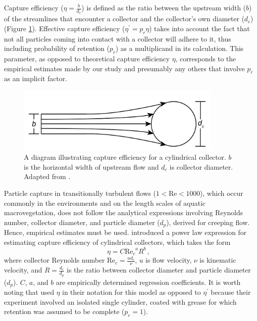 \documentclass{scrreprt}
\newcommand\Rey{\mathrm{Re}}
\begin{document}
Capture efficiency ($\eta=\frac{b}{d_c}$) is defined as the ratio between the upstream width ($b$) of the streamlines that encounter a collector and the collector's own diameter ($d_c$) (Figure \ref{fig:capeff}). Effective capture efficiency ($\eta^\prime=p_r\eta$) takes into account the fact that not all particles coming into contact with a collector will adhere to it, thus including probability of retention ($p_r$) as a multiplicand in its calculation. This parameter, as opposed to theoretical capture efficiency $\eta$, corresponds to the empirical estimates made by our study and presumably any others that involve $p_r$ as an implicit factor.

\begin{figure}[htbp]
\includegraphics[width=10cm]{collectorefficiency.png}
\centering
\caption{A diagram illustrating capture efficiency for a cylindrical collector. $b$ is the horizontal width of upstream flow and $d_c$ is collector diameter. Adapted from \cite{Palmer_2004}.}
\label{fig:capeff}
\end{figure}

Particle capture in transitionally turbulent flows ($1<\Rey<1000$), which occur commonly in the environments and on the length scales of aquatic macrovegetation, does not follow the analytical expressions involving Reynolds number, collector diameter, and particle diameter ($d_p$), derived for creeping flow. Hence, empirical estimates must be used. \cite{Palmer_2004} introduced a power law expression for estimating capture efficiency of cylindrical collectors, which takes the form 
\begin{equation}
    \eta=C{\Rey_c}^{a}R^{b}\,,
    \label{eq:powerlaw}
\end{equation}
where collector Reynolds number $\Rey_c=\frac{ud_c}{\nu}$, $u$ is flow velocity, $\nu$ is kinematic velocity, and $R=\frac{d_c}{d_p}$ is the ratio between collector diameter and particle diameter ($d_p$). $C$, $a$, and $b$ are empirically determined regression coefficients. It is worth noting that \cite{Palmer_2004} used $\eta$ in their notation for this model as opposed to $\eta^\prime$ because their experiment involved an isolated single cylinder, coated with grease for which retention was assumed to be complete ($p_r = 1$).
\end{document}
